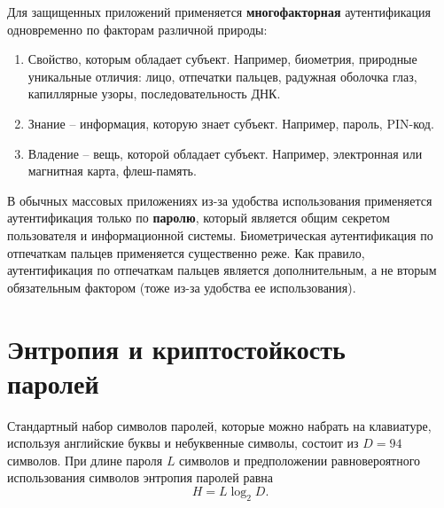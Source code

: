 \documentclass[10pt,a4paper]{book}
\begin{document}
Для защищенных приложений применяется \textbf{многофакторная} аутентификация одновременно по факторам различной природы:
\begin{enumerate}
    \item Свойство, которым обладает субъект. Например, биометрия, природные уникальные отличия: лицо, отпечатки пальцев, радужная оболочка глаз, капиллярные узоры, последовательность ДНК.
    \item Знание -- информация, которую знает субъект. Например, пароль, PIN-код.
    \item Владение -- вещь, которой обладает субъект. Например, электронная или магнитная карта, флеш-память.
\end{enumerate}

В обычных массовых приложениях из-за удобства использования применяется аутентификация только по \textbf{паролю}, который является общим секретом пользователя и информационной системы. Биометрическая аутентификация по отпечаткам пальцев применяется существенно реже. Как правило, аутентификация по отпечаткам пальцев является дополнительным, а не вторым обязательным фактором (тоже из-за удобства ее использования).



\section[Энтропия и криптостойкость паролей]{Энтропия и криптостойкость \protect\\ паролей}

Стандартный набор символов паролей, которые можно набрать на клавиатуре, используя английские буквы и небуквенные символы, состоит из $D=94$ символов. При длине пароля $L$ символов и предположении равновероятного использования символов энтропия паролей равна
    \[ H = L \log_2 D. \]
\end{document}
